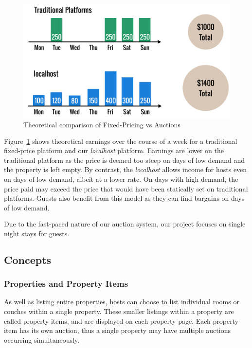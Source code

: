 \begin{figure}[!h]
  \includegraphics[width=\linewidth]{assets/fixedvsdynamic.png}
  \caption{Theoretical comparison of Fixed-Pricing vs Auctions}
  \label{fig:fixedVsDynamic}
\end{figure}

Figure~\ref{fig:fixedVsDynamic} shows theoretical earnings over the course of
a week for a traditional fixed-price platform and our \emph{localhost} platform.
Earnings are lower on the traditional platform as the price is deemed too steep
on days of low demand and the property is left empty.
By contrast, the \emph{localhost} allows income for hosts even on days of low demand,
albeit at a lower rate. On days with high demand, the price paid may exceed the
price that would have been statically set on traditional platforms. Guests also benefit
from this model as they can find bargains on days of low demand.

Due to the fast-paced nature of our auction system, our project focuses on
single night stays for guests.

\subsection{Concepts}

\subsubsection{Properties and Property Items}

As well as listing entire properties, hosts can choose to list individual rooms or
couches within a single property. These smaller listings within a property are
called property items, and are displayed on each property page. Each property item
has its own auction, thus a single property may have multiple auctions occurring
simultaneously.

